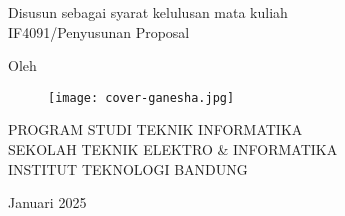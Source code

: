 \clearpage
\pagestyle{empty}

\begin{center}
  \smallskip
  
  \Large \bfseries \MakeUppercase{\thetitle}
  \vfill
  
  
  \large Disusun sebagai syarat kelulusan mata kuliah \\
  IF4091/Penyusunan Proposal
  \vfill
  
  \large Oleh \\
  \Large \theauthor{}
  
  \vfill
  \begin{figure}[ht]
    \centering
    \texttt{[image: cover-ganesha.jpg]}
  \end{figure}
  \vfill
  
  \large
  \uppercase{
    Program Studi Teknik Informatika \\
    Sekolah Teknik Elektro \& Informatika \\
    Institut Teknologi Bandung
  }
  
Januari 2025
  
\end{center}

\clearpage
